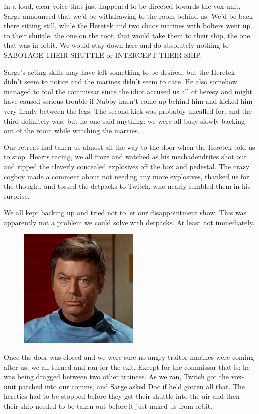 In a loud, clear voice that just happened to be directed towards the vox unit, Sarge announced that we’d be withdrawing to the room behind us. 
We’d be back there sitting still, while the Heretek and two chaos marines with bolters went up to their shuttle, the one on the roof, that would take them to their ship, the one that was in orbit. 
We would stay down here and do absolutely nothing to SABOTAGE THEIR SHUTTLE or INTERCEPT THEIR SHIP.
 
Sarge’s acting skills may have left something to be desired, but the Heretek didn’t seem to notice and the marines didn’t seem to care. 
He also somehow managed to fool the commissar since the idiot accused us all of heresy and might have caused serious trouble if Nubby hadn’t come up behind him and kicked him very firmly between the legs. 
The second kick was probably uncalled for, and the third definitely was, but no one said anything: 
we were all busy slowly backing out of the room while watching the marines.
 
Our retreat had taken us almost all the way to the door when the Heretek told us to stop. 
Hearts racing, we all froze and watched as his mechadendrites shot out and ripped the cleverly concealed explosives off the box and pedestal. 
The crazy cogboy made a comment about not needing any more explosives, thanked us for the thought, and tossed the detpacks to Twitch, who nearly fumbled them in his surprise. 

 
We all kept backing up and tried not to let our disappointment show. 
This was apparently not a problem we could solve with detpacks. 
At least not immediately.

\begin{figure}
	\begin{center}
		\includegraphics[width=\figwidth]{pics/8/54.png}
	\end{center}
\end{figure}
Once the door was closed and we were sure no angry traitor marines were coming after us, we all turned and ran for the exit. 
Except for the commissar that is: 
he was being dragged between two other trainees. 
As we ran, Twitch got the vox-unit patched into our comms, and Sarge asked Doc if he’d gotten all that. 
The heretics had to be stopped before they got their shuttle into the air and then their ship needed to be taken out before it just nuked us from orbit.
 
